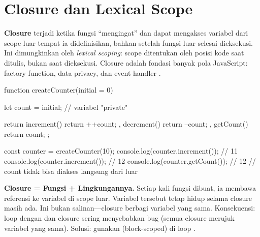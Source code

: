 \section{Closure dan Lexical Scope}

\textbf{Closure} terjadi ketika fungsi ``mengingat'' dan dapat mengakses variabel dari scope luar tempat ia didefinisikan, bahkan setelah fungsi luar selesai dieksekusi. Ini dimungkinkan oleh \textit{lexical scoping}: scope ditentukan oleh posisi kode saat ditulis, bukan saat dieksekusi. Closure adalah fondasi banyak pola JavaScript: factory function, data privacy, dan event handler \cite{eloquentJs}.

\begin{webcode}[language=JavaScript, caption={Closure: counter privat}]
function createCounter(initial = 0) {
  let count = initial; // variabel "private"

  return {
    increment() { return ++count; },
    decrement() { return --count; },
    getCount()  { return count; }
  };
}

const counter = createCounter(10);
console.log(counter.increment()); // 11
console.log(counter.increment()); // 12
console.log(counter.getCount());  // 12
// count tidak bisa diakses langsung dari luar
\end{webcode}

\begin{konsep}
\textbf{Closure = Fungsi + Lingkungannya.} Setiap kali fungsi dibuat, ia membawa referensi ke variabel di scope luar. Variabel tersebut tetap hidup selama closure masih ada. Ini bukan salinan---closure berbagi variabel yang sama. Konsekuensi: loop dengan  dan closure sering menyebabkan bug (semua closure merujuk variabel  yang sama). Solusi: gunakan  (block-scoped) di loop \cite{jsInfo}.
\end{konsep}

